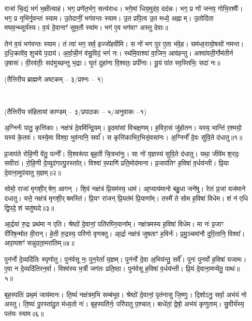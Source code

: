 राजा॑ चि॒द्यं भगं॑ भ॒क्षीत्याह॑।
भग॒ प्रणे॑त॒र्भग॒ सत्य॑राधः।
भगे॒मां धिय॒मुद॑व॒ दद॑न्नः।
भग॒ प्र णो॑ जनय॒ गोभि॒रश्वैः᳚।
भग॒ प्र नृभि॑र्नृ॒वन्तः॑ स्याम।
उ॒तेदानीं॒ भग॑वन्तः स्याम।
उ॒त प्रपि॒त्व उ॒त मध्ये॒ अह्नाम्।
उ॒तोदि॑ता मघव॒न्थ्सूर्य॑स्य।
व॒यं दे॒वानाꣳ॑ सुम॒तौ स्या॑म।
भग॑ ए॒व भग॑वाꣳ अस्तु देवाः॥

तेन॑ व॒यं भग॑वन्तः स्याम।
तं त्वा॑ भग॒ सर्व॒ इज्जो॑हवीमि।
स नो॑ भग पुर ए॒ता भ॑वे॒ह।
सम॑ध्व॒रायो॒षसो॑ नमन्त।
द॒धि॒क्रावे॑व॒ शुच॑ये प॒दाय॑।
अ॒र्वा॒ची॒नं व॑सु॒विदं॒ भगं॑ नः।
रथ॑मि॒वाश्वा॑ वा॒जिन॒ आव॑हन्तु।
अश्वा॑वती॒र्गोम॑तीर्न उ॒षासः॑।
वी॒रव॑तीः॒ सद॑मुच्छन्तु भ॒द्राः।
घृ॒तं दुहा॑ना वि॒श्वतः॒ प्रपी॑नाः।
यू॒यं पा॑त स्व॒स्तिभिः॒ सदा॑ नः॥

\centerline{\scriptsize(तैत्तिरीय ब्राह्मणे अष्टकम् -- ३/प्रश्नः -- १)}\mbox{}\\[-2em]
\centerline{\scriptsize(तैत्तिरीय संहितायां काण्डम् -- ३/प्रपाठकः -- ५/अनुवाकः --१)}

अ॒ग्निर्नः॑ पातु॒ कृत्ति॑काः। 
नक्ष॑त्रं दे॒वमि॑न्द्रि॒यम्। 
इ॒दमा॑सां विचक्ष॒णम्। 
ह॒विरा॒सं जु॑होतन। 
यस्य॒ भान्ति॑ र॒श्मयो॒ यस्य॑ के॒तवः॑। 
यस्ये॒मा विश्वा॒ भुव॑नानि॒ सर्वा᳚। 
स कृत्ति॑काभि\-र॒भिसं॒वसा॑नः। 
अ॒ग्निर्नो॑ दे॒वः सु॑वि॒ते द॑धातु॥१॥ 

प्र॒जाप॑ते रोहि॒णी वे॑तु॒ पत्नी᳚। 
वि॒श्वरू॑पा बृह॒ती चि॒त्रभा॑नुः। 
सा नो॑ य॒ज्ञस्य॑ सुवि॒ते द॑धातु। 
यथा॒ जीवे॑म श॒रदः॒ सवीराः॑। 
रो॒हि॒णी दे॒व्युद॑गात्पु॒रस्ता᳚त्। 
विश्वा॑ रू॒पाणि॑ प्रति॒मोद॑माना। 
प्र॒जाप॑तिꣳ ह॒विषा॑ व॒र्धय॑न्ती। 
प्रि॒या दे॒वाना॒मुप॑यातु य॒ज्ञम्॥२॥ 

सोमो॒ राजा॑ मृगशी॒र्‌षेण॒ आगन्। 
शि॒वं नक्ष॑त्रं प्रि॒यम॑स्य॒ धाम॑। 
आ॒प्याय॑मानो बहु॒धा जने॑षु। 
रेतः॑ प्र॒जां यज॑माने दधातु। 
यत्ते॒ नक्ष॑त्रं मृगशी॒र्‌षमस्ति॑। 
प्रि॒यꣳ रा॑जन् प्रि॒यत॑मं प्रि॒याणा᳚म्। 
तस्मै॑ ते सोम ह॒विषा॑ विधेम। 
शं न॑ एधि द्वि॒पदे॒ शं चतु॑ष्पदे॥३॥ 

आ॒र्द्रया॑ रु॒द्रः प्रथ॑मा न एति। 
श्रेष्ठो॑ दे॒वानां॒ पति॑रघ्नि॒याना᳚म्। 
नक्ष॑त्रमस्य ह॒विषा॑ विधेम। 
मा नः॑ प्र॒जाꣳ री॑रिष॒न्मोत वी॒रान्। 
हे॒ती रु॒द्रस्य॒ परि॑णो वृणक्तु। 
आ॒र्द्रा नक्ष॑त्रं जुषताꣳ ह॒विर्नः॑। 
प्र॒मु॒ञ्चमा॑नौ दुरि॒तानि॒ विश्वा᳚। 
अपा॒घशꣳ॑ सन्नुदता॒मरा॑तिम्॥४॥ 

पुन॑र्नो दे॒व्यदि॑तिः स्पृणोतु। 
पुन॑र्वसू नः॒ पुन॒रेतां᳚ य॒ज्ञम्। 
पुन॑र्नो दे॒वा अ॒भिय॑न्तु॒ सर्वे᳚। 
पुनः॑ पुनर्वो ह॒विषा॑ यजामः। 
ए॒वा न दे॒व्यदि॑तिरन॒र्वा। 
विश्व॑स्य भ॒र्त्री जग॑तः प्रति॒ष्ठा। 
पुन॑र्वसू ह॒विषा॑ व॒र्धय॑न्ती। 
प्रि॒यं दे॒वाना॒मप्ये॑तु॒ पाथः॑॥५॥ 

बृह॒स्पतिः॑ प्रथ॒मं जाय॑मानः। 
ति॒ष्यं॑ नक्ष॑त्रम॒भि सम्ब॑भूव। 
श्रेष्ठो॑ दे॒वानां॒ पृत॑नासु  जि॒ष्णुः। 
दि॒शोऽनु॒ सर्वा॒ अभ॑यं नो अस्तु। 
ति॒ष्यः॑ पु॒रस्ता॑दु॒त म॑ध्य॒तो नः॑। 
बृह॒स्पति॑र्नः॒ परि॑पातु प॒श्चात्। 
बाधे॑तां॒ द्वेषो॒ अभ॑यं कृणुताम्। 
सु॒वीर्य॑स्य॒ पत॑यः स्याम॥६॥ 

